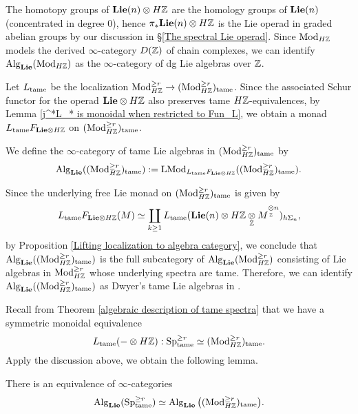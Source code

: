 \begin{remark}
The homotopy groups of $\spLie(n)\otimes H\BZ$ are the homology groups of $\spLie(n)$ (concentrated in degree $0$), hence $\pi_* \spLie(n)\otimes H\BZ$ is the Lie operad in graded abelian groups by our discussion in \S \ref{The spectral Lie operad}.
Since $\Mod_{H\BZ}$ models the derived $\infty$-category $D(\BZ)$ of chain complexes, we can identify 
$\Alg_{\spLie}(\Mod_{H\BZ})$ as the $\infty$-category of dg Lie algebras over $\BZ$.
\end{remark}

Let $L_{\tame}$ be the localization $\Mod_{H\BZ}^{\geq r} \to (\Mod_{H\BZ}^{\geq r})_{\tame}$. Since the associated Schur functor for the operad $\spLie\otimes H\BZ$ also preserves tame $H\BZ$-equivalences, by Lemma \ref{j^*L_* is monoidal when restricted to Fun_L}, we obtain a monad $L_{\tame}F_{\spLie \otimes H\BZ}$ on $(\Mod_{H\BZ}^{\geq r})_{\tame}$.

\begin{definition}
We define the $\infty$-category of tame Lie algebras in $(\Mod_{H\BZ}^{\geq r})_{\tame}$ by 
$$
\Alg_{\spLie}((\Mod_{H\BZ}^{\geq r})_{\tame}): = \LMod_{L_{\tame}F_{\spLie \otimes H\BZ}}((\Mod_{H\BZ}^{\geq r})_{\tame}).
$$
\end{definition}
\begin{remark}
\label{Identify tame Lie algebra with Dwyer's Lie algebra}
Since the underlying free Lie monad on $(\Mod_{H\BZ}^{\geq r})_{\tame}$ is given by
$$
L_{\tame}F_{\spLie \otimes H\BZ}(M)
\simeq \coprod_{k\geq 1} 
L_{\tame}(\spLie(n)\otimes H\BZ \underset{\BZ}{\otimes} M^{\underset{\BZ}{\otimes}n})_{h\Sigma_n},
$$
by Proposition \ref{Lifting localization to algebra category}, we conclude that $\Alg_{\spLie}((\Mod_{H\BZ}^{\geq r})_{\tame})$ is the full subcategory of 
$\Alg_{\spLie}(\Mod^{\geq r}_{H\BZ})$ consisting of Lie algebras in $\Mod^{\geq r}_{H\BZ}$ whose underlying spectra are tame.
Therefore, we can identify $\Alg_{\spLie}((\Mod_{H\BZ}^{\geq r})_{\tame})$ as Dwyer's tame Lie algebras in \cite{Dwyer}.
\end{remark}

Recall from Theorem \ref{algebraic description of tame spectra} that we have a symmetric monoidal equivalence
$$
L_{\tame}(-\otimes H\BZ):
\Sp^{\geq r}_{\tame} \simeq
(\Mod_{H\BZ}^{\geq r})_{\tame}.
$$
Apply the discussion above, we obtain the following lemma.
\begin{lemma}
There is an equivalence of $\infty$-categories
$$
\Alg_{\spLie}(\Sp^{\geq r}_{\tame}) \simeq \Alg_{\spLie}\big((\Mod_{H\BZ}^{\geq r})_{\tame}\big).
$$
\end{lemma}

